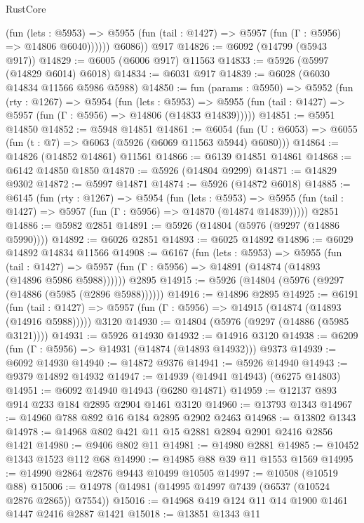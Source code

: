\begin{lexlean}{RustCore}
\begin{coremodule}
              (fun (lets : @5953) =>
              @5955 (fun (tail : @1427) => @5957 (fun (Γ : @5956) => @14806 @6040))))))
        @6086))
    @917
@14826 := @6092 (@14799 (@5943 @917))
@14829 := @6005 (@6006 @917) @11563
@14833 := @5926 (@5997 (@14829 @6014) @6018)
@14834 := @6031 @917
@14839 := @6028 (@6030 @14834 @11566 @5986 @5988)
@14850 := fun (params : @5950) =>
  @5952
    (fun (rty : @1267) =>
    @5954
      (fun (lets : @5953) =>
      @5955 (fun (tail : @1427) => @5957 (fun (Γ : @5956) => @14806 (@14833 @14839)))))
@14851 := @5951 @14850
@14852 := @5948 @14851
@14861 := @6054
    (fun (U : @6053) => @6055 (fun (t : @7) => @6063 (@5926 (@6069 @11563 @5944) @6080)))
@14864 := @14826 (@14852 @14861) @11561
@14866 := @6139 @14851 @14861
@14868 := @6142 @14850 @1850
@14870 := @5926 (@14804 @9299)
@14871 := @14829 @9302
@14872 := @5997 @14871
@14874 := @5926 (@14872 @6018)
@14885 := @6145
    (fun (rty : @1267) =>
    @5954
      (fun (lets : @5953) =>
      @5955 (fun (tail : @1427) => @5957 (fun (Γ : @5956) => @14870 (@14874 @14839)))))
    @2851
@14886 := @5982 @2851
@14891 := @5926 (@14804 (@5976 (@9297 (@14886 @5990))))
@14892 := @6026 @2851
@14893 := @6025 @14892
@14896 := @6029 @14892 @14834 @11566
@14908 := @6167
    (fun (lets : @5953) =>
    @5955
      (fun (tail : @1427) =>
      @5957 (fun (Γ : @5956) => @14891 (@14874 (@14893 (@14896 @5986 @5988))))))
    @2895
@14915 := @5926 (@14804 (@5976 (@9297 (@14886 (@5985 (@2896 @5988))))))
@14916 := @14896 @2895
@14925 := @6191
    (fun (tail : @1427) => @5957 (fun (Γ : @5956) => @14915 (@14874 (@14893 (@14916 @5988)))))
    @3120
@14930 := @14804 (@5976 (@9297 (@14886 (@5985 @3121))))
@14931 := @5926 @14930
@14932 := @14916 @3120
@14938 := @6209 (fun (Γ : @5956) => @14931 (@14874 (@14893 @14932))) @9373
@14939 := @6092 @14930
@14940 := @14872 @9376
@14941 := @5926 @14940
@14943 := @9379 @14892 @14932
@14947 := @14939 (@14941 @14943) (@6275 @14803)
@14951 := @6092 @14940 @14943 (@6280 @14871)
@14959 := @12137 @893 @914 @233 @184 @2895 @2904 @1461 @3120
@14960 := @13793 @1343
@14967 := @14960 @788 @892 @16 @184 @2895 @2902 @2463
@14968 := @13802 @1343
@14978 := @14968 @802 @421 @11 @15 @2881 @2894 @2901 @2416 @2856 @1421
@14980 := @9406 @802 @11
@14981 := @14980 @2881
@14985 := @10452 @1343 @1523 @112 @68
@14990 := @14985 @88 @39 @11 @1553 @1569
@14995 := @14990 @2864 @2876 @9443 @10499 @10505
@14997 := @10508 (@10519 @88)
@15006 := @14978 (@14981 (@14995 @14997 @7439 (@6537 (@10524 @2876 @2865)) @7554))
@15016 := @14968 @419 @124 @11 @14 @1900 @1461 @1447 @2416 @2887 @1421
@15018 := @13851 @1343 @11

\end{coremodule}
\end{lexlean}
